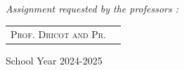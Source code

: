 \documentclass[11pt,a4paper]{report}
\begin{document}
\begin{titlepage}
\begin{minipage}{0.4\textwidth}
  \begin{flushright} \large
    \begin{flushleft} \large
    \emph{} \\
        

    \end{flushleft}

  \end{flushright}
\end{minipage}\\[1cm]

{\large \textit{Assignment requested by the professors  : }}\\[0.5cm]

\centering
\begin{tabular}{ll}
\large \textsc{Prof. Dricot and Pr.  }
\end{tabular}

\vspace{20mm}

{\large School Year 2024-2025}

\end{titlepage}
\end{document}
